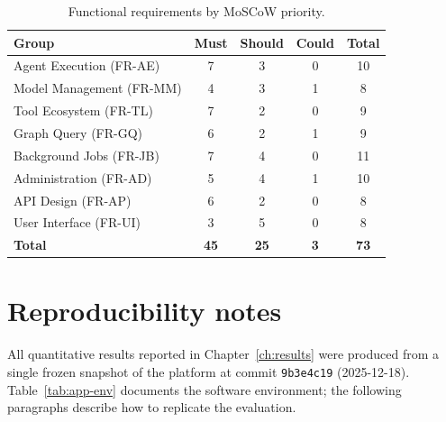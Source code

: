 \documentclass[a4paper]{sapthesis}
\begin{document}
\begin{table}[ht]
\centering
\caption{Functional requirements by MoSCoW priority.}
\label{tab:app-fr-moscow}
\small
\begin{tabularx}{\textwidth}{@{}l c c c c@{}}
    \hline
    \textbf{Group} & \textbf{Must} & \textbf{Should} & \textbf{Could}
        & \textbf{Total} \\
    \hline
    Agent Execution (FR-AE)      & 7  & 3 & 0 & 10 \\
    Model Management (FR-MM)     & 4  & 3 & 1 &  8 \\
    Tool Ecosystem (FR-TL)       & 7  & 2 & 0 &  9 \\
    Graph Query (FR-GQ)          & 6  & 2 & 1 &  9 \\
    Background Jobs (FR-JB)      & 7  & 4 & 0 & 11 \\
    Administration (FR-AD)       & 5  & 4 & 1 & 10 \\
    API Design (FR-AP)           & 6  & 2 & 0 &  8 \\
    User Interface (FR-UI)       & 3  & 5 & 0 &  8 \\
    \hline
    \textbf{Total}               & \textbf{45} & \textbf{25} &
        \textbf{3} & \textbf{73} \\
    \hline
\end{tabularx}
\end{table}


\section{Reproducibility notes}
\label{app:reproducibility}

All quantitative results reported in Chapter~\ref{ch:results} were
produced from a single frozen snapshot of the platform at commit
\texttt{9b3e4c19} (2025-12-18).  Table~\ref{tab:app-env} documents the
software environment; the following paragraphs describe how to
replicate the evaluation.
\end{document}
